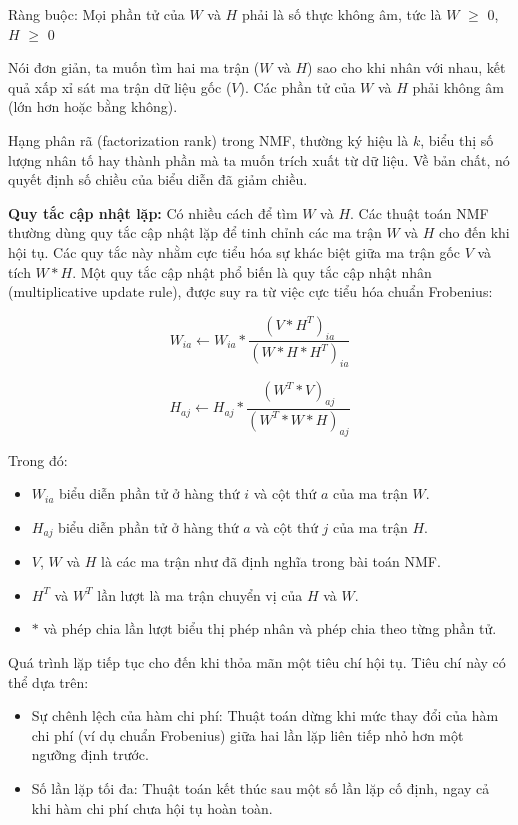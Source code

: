 Ràng buộc: Mọi phần tử của \(W\) và \(H\) phải là số thực không âm, tức là \(W\) \ensuremath{\geq} 0, \(H\) \ensuremath{\geq} 0

Nói đơn giản, ta muốn tìm hai ma trận (\(W\) và \(H\)) sao cho khi nhân với nhau, kết quả xấp xỉ sát ma trận dữ liệu gốc (\(V\)). Các phần tử của \(W\) và \(H\) phải không âm (lớn hơn hoặc bằng không).

Hạng phân rã (factorization rank) trong NMF, thường ký hiệu là \(k\), biểu thị số lượng nhân tố hay thành phần mà ta muốn trích xuất từ dữ liệu. Về bản chất, nó quyết định số chiều của biểu diễn đã giảm chiều.

\textbf{Quy tắc cập nhật lặp:} Có nhiều cách để tìm \(W\) và \(H\). Các thuật toán NMF thường dùng quy tắc cập nhật lặp để tinh chỉnh các ma trận \(W\) và \(H\) cho đến khi hội tụ. Các quy tắc này nhằm cực tiểu hóa sự khác biệt giữa ma trận gốc \(V\) và tích \(W * H\). Một quy tắc cập nhật phổ biến là quy tắc cập nhật nhân (multiplicative update rule), được suy ra từ việc cực tiểu hóa chuẩn Frobenius:

\[
W_{ia} \leftarrow W_{ia} * \frac{(V * H^T)_{ia}}{(W * H * H^T)_{ia}}
\]

\[
H_{aj} \leftarrow H_{aj} * \frac{(W^T * V)_{aj}}{(W^T * W * H)_{aj}}
\]

Trong đó:

\begin{itemize}
\item
  \(W_{ia}\) biểu diễn phần tử ở hàng thứ \(i\) và cột thứ \(a\) của ma trận \(W\).
\item
  \(H_{aj}\) biểu diễn phần tử ở hàng thứ \(a\) và cột thứ \(j\) của ma trận \(H\).
\item
  \(V\), \(W\) và \(H\) là các ma trận như đã định nghĩa trong bài toán NMF.
\item
  \(H^T\) và \(W^T\) lần lượt là ma trận chuyển vị của \(H\) và \(W\).
\item
  \(*\) và phép chia lần lượt biểu thị phép nhân và phép chia theo từng phần tử.
\end{itemize}

Quá trình lặp tiếp tục cho đến khi thỏa mãn một tiêu chí hội tụ. Tiêu chí này có thể dựa trên:

\begin{itemize}
\item
  Sự chênh lệch của hàm chi phí: Thuật toán dừng khi mức thay đổi của hàm chi phí (ví dụ chuẩn Frobenius) giữa hai lần lặp liên tiếp nhỏ hơn một ngưỡng định trước.
\item
  Số lần lặp tối đa: Thuật toán kết thúc sau một số lần lặp cố định, ngay cả khi hàm chi phí chưa hội tụ hoàn toàn.
\end{itemize}

